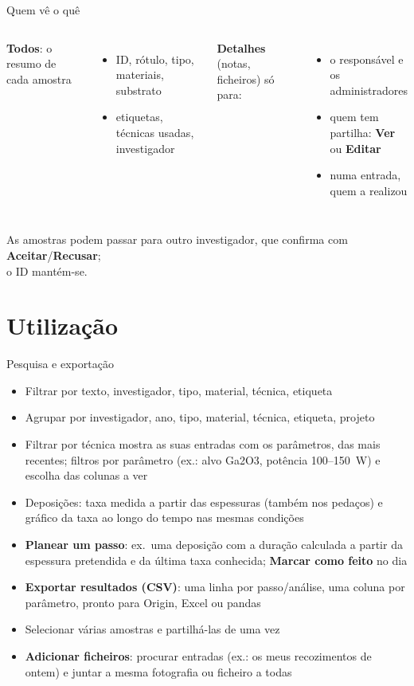 \documentclass[aspectratio=169,11pt]{beamer}
\newcommand{\ui}[1]{\textsf{\textbf{#1}}}
\begin{document}
\begin{frame}{Quem vê o quê}
  \begin{columns}[T]
    \textbf{Todos}: o resumo de cada amostra
    \begin{itemize}\small
      \item ID, rótulo, tipo, materiais, substrato
      \item etiquetas, técnicas usadas, investigador
    \end{itemize}
    \textbf{Detalhes} (notas, ficheiros) só para:
    \begin{itemize}\small
      \item o responsável e os administradores
      \item quem tem partilha: \ui{Ver} ou \ui{Editar}
      \item numa entrada, quem a realizou
    \end{itemize}
  \end{columns}

  \vspace{0.5cm}
  \small As amostras podem passar para outro investigador, que confirma
  com \ui{Aceitar}/\ui{Recusar};\\ o ID mantém-se.
\end{frame}

\section{Utilização}
\begin{frame}{Pesquisa e exportação}
  \begin{itemize}
    \item Filtrar por texto, investigador, tipo, material, técnica, etiqueta
    \item Agrupar por investigador, ano, tipo, material, técnica, etiqueta, projeto
    \item Filtrar por técnica mostra as suas entradas com os parâmetros,
          das mais recentes; filtros por parâmetro (ex.: alvo Ga2O3, potência
          100--150~W) e escolha das colunas a ver
    \item Deposições: taxa medida a partir das espessuras (também nos
          pedaços) e gráfico da taxa ao longo do tempo nas mesmas condições
    \item \textbf{Planear um passo}: ex.\ uma deposição com a duração calculada
          a partir da espessura pretendida e da última taxa conhecida;
          \ui{Marcar como feito} no dia
    \item \ui{Exportar resultados (CSV)}: uma linha por passo/análise, uma
          coluna por parâmetro, pronto para Origin, Excel ou pandas
    \item Selecionar várias amostras e partilhá-las de uma vez
    \item \textbf{Adicionar ficheiros}: procurar entradas (ex.: os meus
          recozimentos de ontem) e juntar a mesma fotografia ou ficheiro a todas
  \end{itemize}
\end{frame}
\end{document}

